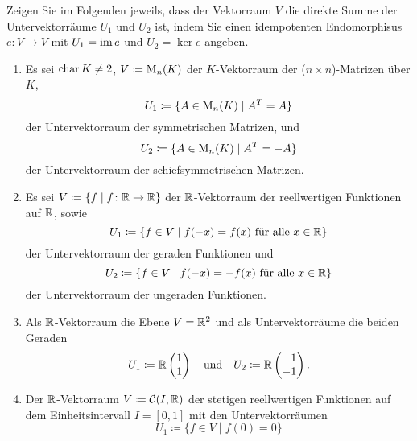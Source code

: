 \begin{question}[subtitle = Idempotente konstruieren]{3}
  Zeigen Sie im Folgenden jeweils, dass der Vektorraum $V$ die direkte Summe der Untervektorräume $U_1$ und $U_2$ ist, indem Sie einen idempotenten Endomorphisus $e \colon V \to V$ mit $U_1 = \operatorname{im} e$ und $U_2 = \ker e$ angeben.
  \begin{enumerate}[leftmargin=*]
    \item
      Es sei $\operatorname{char} K \neq 2$, $V \coloneqq \operatorname{M}_n(K)$ der $K$-Vektorraum der ($n \times n$)-Matrizen über $K$,
      \[
        U_1 \coloneqq \{ A \in \operatorname{M}_n(K) \mid A^T = A \}
      \]
      der Untervektorraum der symmetrischen Matrizen, und
      \[
        U_2 \coloneqq \{ A \in \operatorname{M}_n(K) \mid A^T = -A \}
      \]
      der Untervektorraum der schiefsymmetrischen Matrizen.
    \item
      Es sei $V \coloneqq \{ f \mid f \colon \mathbb{R} \to \mathbb{R} \}$ der $\mathbb{R}$-Vektorraum der reellwertigen Funktionen auf $\mathbb{R}$, sowie
      \[
        U_1 \coloneqq \{ f \in V \mid \text{$f(-x) = f(x)$ für alle $x \in \mathbb{R}$} \}
      \]
      der Untervektorraum der geraden Funktionen und
      \[
        U_2 \coloneqq \{ f \in V \mid \text{$f(-x) = -f(x)$ für alle $x \in \mathbb{R}$} \}
      \]
      der Untervektorraum der ungeraden Funktionen.
    \item
      Als $\mathbb{R}$-Vektorraum die Ebene $V = \mathbb{R}^2$ und als Untervektorräume die beiden Geraden
      \[
        U_1 \coloneqq \mathbb{R} \begin{pmatrix} 1 \\  1 \end{pmatrix}
        \quad\text{und}\quad
        U_2 \coloneqq \mathbb{R} \begin{pmatrix} \phantom{-}1 \\ -1 \end{pmatrix}.
      \]
    \item
      Der $\mathbb{R}$-Vektorraum $V \coloneqq \mathcal{C}(I, \mathbb{R})$ der stetigen reellwertigen Funktionen auf dem Einheitsintervall $I = [0,1]$ mit den Untervektorräumen
      \[
        U_1 \coloneqq \{f \in V \mid f(0) = 0\}
\]
\end{enumerate}
\end{question}
